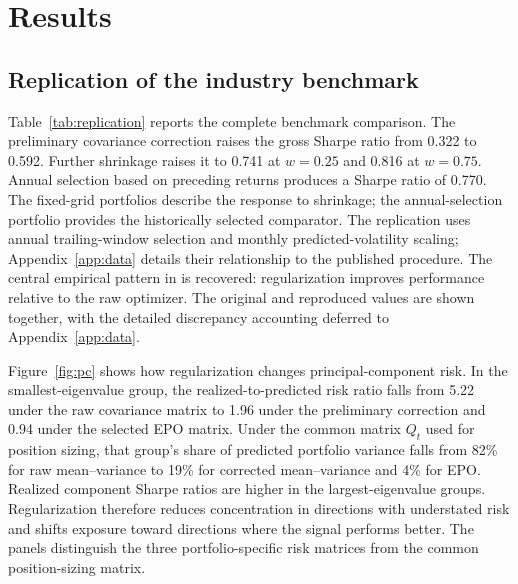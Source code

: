 \section{Results}
\label{sec:results}
\subsection{Replication of the industry benchmark}
Table~\ref{tab:replication} reports the complete benchmark comparison. The preliminary covariance correction raises the gross Sharpe ratio from 0.322 to 0.592. Further shrinkage raises it to 0.741 at $w=0.25$ and 0.816 at $w=0.75$. Annual selection based on preceding returns produces a Sharpe ratio of 0.770. The fixed-grid portfolios describe the response to shrinkage; the annual-selection portfolio provides the historically selected comparator. The replication uses annual trailing-window selection and monthly predicted-volatility scaling; Appendix~\ref{app:data} details their relationship to the published procedure. The central empirical pattern in \citet{pedersen2021} is recovered: regularization improves performance relative to the raw optimizer. The original and reproduced values are shown together, with the detailed discrepancy accounting deferred to Appendix~\ref{app:data}.


Figure~\ref{fig:pc} shows how regularization changes principal-component risk. In the smallest-eigenvalue group, the realized-to-predicted risk ratio falls from 5.22 under the raw covariance matrix to 1.96 under the preliminary correction and 0.94 under the selected EPO matrix. Under the common matrix $Q_t$ used for position sizing, that group's share of predicted portfolio variance falls from 82\% for raw mean--variance to 19\% for corrected mean--variance and 4\% for EPO. Realized component Sharpe ratios are higher in the largest-eigenvalue groups. Regularization therefore reduces concentration in directions with understated risk and shifts exposure toward directions where the signal performs better. The panels distinguish the three portfolio-specific risk matrices from the common position-sizing matrix.

